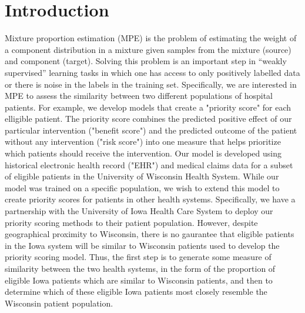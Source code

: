 \documentclass[lineno]{biometrika}
\begin{document}
\section{Introduction}
Mixture proportion estimation (MPE) is the problem of estimating the weight of a component distribution in a mixture given samples from the mixture (source) and component (target). Solving this problem is an important step in “weakly supervised” learning tasks in which one has access to only positively labelled data or there is noise in the labels in the training set. Specifically, we are interested in MPE to assess the similarity between two different populations of hospital patients. For example, we develop models that create a "priority score" for each elligible patient. The priority score combines the predicted positive effect of our particular intervention ("benefit score") and the predicted outcome of the patient without any intervention ("risk score") into one measure that helps prioritize which patients should receive the intervention. Our model is developed using historical electronic health record ("EHR") and medical claims data for a subset of eligible patients in the University of Wisconsin Health System. While our model was trained on a specific population, we wish to extend this model to create priority scores for patients in other health systems. Specifically, we have a partnership with the University of Iowa Health Care System to deploy our priority scoring methods to their patient population. However, despite geographical proximity to Wisconsin, there is no gaurantee that eligible patients in the Iowa system will be similar to Wisconsin patients used to develop the priority scoring model. Thus, the first step is to generate some measure of similarity between the two health systems, in the form of the proportion of eligible Iowa patients which are similar to Wisconsin patients, and then to determine which of these eligible Iowa patients most closely resemble the Wisconsin patient population. 
\end{document}
